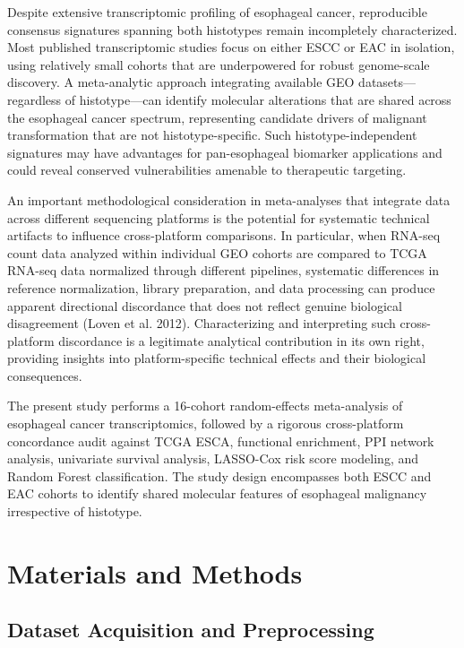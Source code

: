 \documentclass[
  12pt,
]{article}
\begin{document}
Despite extensive transcriptomic profiling of esophageal cancer,
reproducible consensus signatures spanning both histotypes remain
incompletely characterized. Most published transcriptomic studies focus
on either ESCC or EAC in isolation, using relatively small cohorts that
are underpowered for robust genome-scale discovery. A meta-analytic
approach integrating available GEO datasets---regardless of
histotype---can identify molecular alterations that are shared across
the esophageal cancer spectrum, representing candidate drivers of
malignant transformation that are not histotype-specific. Such
histotype-independent signatures may have advantages for pan-esophageal
biomarker applications and could reveal conserved vulnerabilities
amenable to therapeutic targeting.

An important methodological consideration in meta-analyses that
integrate data across different sequencing platforms is the potential
for systematic technical artifacts to influence cross-platform
comparisons. In particular, when RNA-seq count data analyzed within
individual GEO cohorts are compared to TCGA RNA-seq data normalized
through different pipelines, systematic differences in reference
normalization, library preparation, and data processing can produce
apparent directional discordance that does not reflect genuine
biological disagreement (Loven et al. 2012). Characterizing and
interpreting such cross-platform discordance is a legitimate analytical
contribution in its own right, providing insights into platform-specific
technical effects and their biological consequences.

The present study performs a 16-cohort random-effects meta-analysis of
esophageal cancer transcriptomics, followed by a rigorous cross-platform
concordance audit against TCGA ESCA, functional enrichment, PPI network
analysis, univariate survival analysis, LASSO-Cox risk score modeling,
and Random Forest classification. The study design encompasses both ESCC
and EAC cohorts to identify shared molecular features of esophageal
malignancy irrespective of histotype.

\section{Materials and Methods}\label{materials-and-methods}

\subsection{Dataset Acquisition and
Preprocessing}\label{dataset-acquisition-and-preprocessing}
\end{document}

